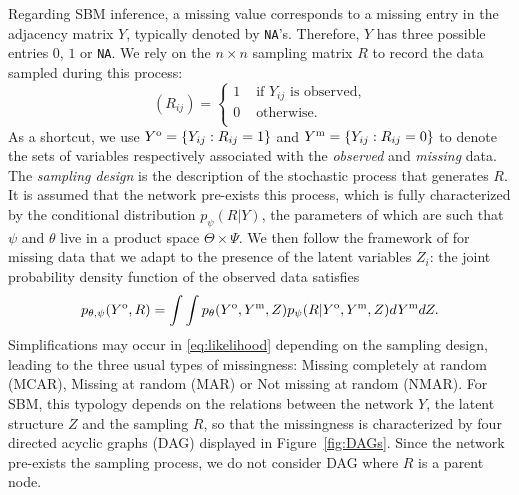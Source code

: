 \documentclass[]{imsart}
\newcommand{\1}{\mathds{1}}
\newcommand{\MA}{Y}
\newcommand{\MAO}{\MA^\text{\rm o}}
\newcommand{\MAM}{\MA^\text{\rm m}}
\numberwithin{equation}{section}
\theoremstyle{plain}
\theoremstyle{remark}
\begin{document}
Regarding SBM inference, a missing value corresponds to a missing entry in the adjacency matrix $\MA$, typically denoted by \texttt{NA}'s.
Therefore, $\MA$ has three possible entries $0$, $1$ or \texttt{NA}.
We rely on the $n\times n$ sampling matrix $R$ to record the data sampled during this process:
\begin{equation}
\label{eq:R}
 (R_{ij}) = \begin{cases}
  1 &   \text{ if $\MA_{ij}$  is observed,}  \\
  0 &   \text{ otherwise.}  \\
\end{cases}
\end{equation}
As  a  shortcut,  we use  $\MAO  =  \{\MA_{ij}  :  R_{ij} =  1\}$  and
$\MAM=\{\MA_{ij} :  R_{ij} =  0 \}$  to denote  the sets  of variables
respectively    associated    with     the    \textit{observed}    and
\textit{missing} data.  The \emph{sampling  design} is the description
of the stochastic process that generates  $R$.  It is assumed that the
network pre-exists this process, which is fully characterized by the
conditional distribution $p_\psi(R|\MA)$, the parameters of which are
such   that   $\psi$   and   $\theta$   live   in   a   product   space
$\Theta   \times   \Psi$.    We    then   follow   the   framework   of
\citet{Rubin1976} for  missing data that  we adapt to the  presence of
the latent variables $Z_i$: the  joint probability density function of
the observed data satisfies
\begin{equation}
p_{\theta, \psi}(\MAO,R)=\int \int p_{\theta}(\MAO,\MAM,Z)p_\psi(R|\MAO,\MAM,Z)d\MAM dZ.
\label{eq:likelihood}
\end{equation}
Simplifications may  occur in  \eqref{eq:likelihood} depending  on the
sampling  design, leading  to the  three usual  types of  missingness:
Missing completely  at random (MCAR),  Missing at random (MAR)  or Not
missing  at random  (NMAR).  For  SBM,  this typology  depends on  the
relations between  the network $Y$,  the latent structure $Z$  and the
sampling  $R$,  so  that  the missingness  is  characterized  by  four
directed acyclic graphs (DAG) displayed in Figure~\ref{fig:DAGs}.
Since the network pre-exists the sampling process, we do not consider DAG where
$R$ is a parent node.
\end{document}
